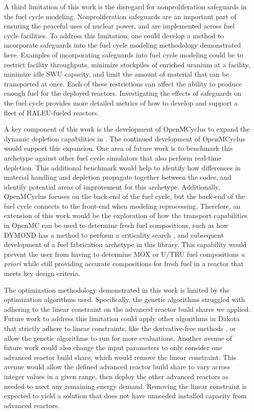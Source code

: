 A third limitation of this work is the disregard for nonproliferation 
safeguards in the fuel cycle modeling. Nonproliferation safeguards 
are an important part of ensuring the peaceful uses of nuclear 
power, and are implemented across fuel cycle facilities. To 
address this limitation, one could develop 
a method to incorporate safeguards into the fuel cycle modeling
methodology demonstrated here. 
Examples of incorporating safeguards into fuel cycle modeling could 
be to restrict facility throughputs, minimize stockpiles of 
enriched uranium at a facility, minimize idle \gls{SWU} 
capacity, and limit the amount of material that can be transported 
at once. Each of these restrictions can affect the ability 
to produce enough fuel for the deployed reactors. Investigating 
the effects of safeguards on the fuel cycle provides more 
detailed metrics of how to develop and support a fleet of 
\gls{HALEU}-fueled reactors. 

A key component of this work is the development of OpenMCyclus 
to expand the dynamic depletion capabilities in \Cyclus. The 
continued development of OpenMCyclus would support this expansion.  
One area of future work is to benchmark this archetype against 
other fuel cycle simulators that also perform real-time 
depletion. This additional benchmark would help to identify 
how differences in material handling and depletion 
propagate together between the codes, and identify potential 
areas of improvement for this archetype. 
Additionally, OpenMCyclus focuses on the back-end of 
the fuel cycle, but the back-end of the fuel cycle connects 
to the front-end when modeling reprocessing. Therefore, an 
extension of this work would be the
exploration of how the transport capabilities in OpenMC can 
be used to determine fresh fuel compositions, such as 
how \gls{DYMOND} has a method to perform a criticality search 
\cite{richards_application_2021}, and subsequent development 
of a fuel fabrication archetype in this library. 
This capability would prevent the user from having to determine 
\gls{MOX} or U/TRU fuel compositions \textit{a priori} while 
still providing accurate compositions for fresh fuel in a 
reactor that meets key design criteria.  

The optimization methodology demonstrated in this work is 
limited by the optimization algorithms used. Specifically, the 
genetic algorithms struggled with adhering to the linear constraint 
on the advanced reactor build shares we applied. Future work to address this 
limitation could apply other algorithms in Dakota that strictly 
adhere to linear constraints, like the derivative-free methods 
\cite{adams_dakota_2021}, or allow the genetic algorithms to 
run for more evaluations. Another avenue of future work could 
also change the input parameters to only consider one advanced 
reactor build share, which would remove the linear constraint. 
This avenue would allow the defined advanced reactor build share to 
vary across integer values in a given range, then deploy the other 
advanced reactors as needed to meet any 
remaining energy demand. Removing the linear constraint is 
expected to yield a solution that does not have unneeded installed 
capacity from advanced reactors. 

